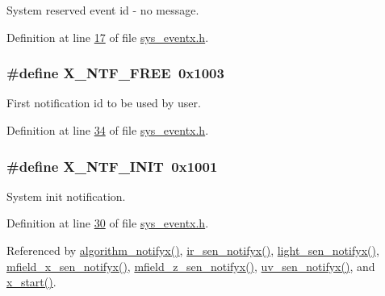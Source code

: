 System reserved event id -\/ no message. 



Definition at line \hyperlink{a00036_source_l00017}{17} of file \hyperlink{a00036_source}{sys\+\_\+eventx.\+h}.

\hypertarget{a00036_ab2eeea4643823a0c7c7731ddb83e3edc}{
\subsubsection[{X\+\_\+\+N\+T\+F\+\_\+\+F\+R\+E\+E}]{\setlength{\rightskip}{0pt plus 5cm}\#define X\+\_\+\+N\+T\+F\+\_\+\+F\+R\+E\+E~0x1003}}\label{a00036_ab2eeea4643823a0c7c7731ddb83e3edc}


First notification id to be used by user. 



Definition at line \hyperlink{a00036_source_l00034}{34} of file \hyperlink{a00036_source}{sys\+\_\+eventx.\+h}.

\hypertarget{a00036_a620b808f2d7b8d2a03c4d026a4c5423c}{
\subsubsection[{X\+\_\+\+N\+T\+F\+\_\+\+I\+N\+I\+T}]{\setlength{\rightskip}{0pt plus 5cm}\#define X\+\_\+\+N\+T\+F\+\_\+\+I\+N\+I\+T~0x1001}}\label{a00036_a620b808f2d7b8d2a03c4d026a4c5423c}


System init notification. 



Definition at line \hyperlink{a00036_source_l00030}{30} of file \hyperlink{a00036_source}{sys\+\_\+eventx.\+h}.



Referenced by \hyperlink{a00038_source_l02006}{algorithm\+\_\+notifyx()}, \hyperlink{a00045_source_l00141}{ir\+\_\+sen\+\_\+notifyx()}, \hyperlink{a00047_source_l00106}{light\+\_\+sen\+\_\+notifyx()}, \hyperlink{a00050_source_l00107}{mfield\+\_\+x\+\_\+sen\+\_\+notifyx()}, \hyperlink{a00053_source_l00114}{mfield\+\_\+z\+\_\+sen\+\_\+notifyx()}, \hyperlink{a00073_source_l00141}{uv\+\_\+sen\+\_\+notifyx()}, and \hyperlink{a00037_source_l00196}{x\+\_\+start()}.

